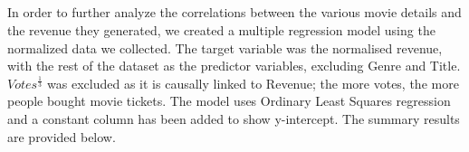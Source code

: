     \subsection*{}
        \paragraph{}


            In order to further analyze the correlations between the various movie details
                and the revenue they generated, we created a multiple regression model using
                the normalized data we collected.
            The target variable was the normalised revenue, with the rest of the dataset as
                the predictor variables, excluding Genre and Title.
            $Votes^\frac{1}{3}$ was excluded as it is causally linked to Revenue; the more votes, the more people bought movie tickets.
            The model uses Ordinary Least Squares regression and a constant column has been
                added to show y-intercept.
            The summary results are provided below.
